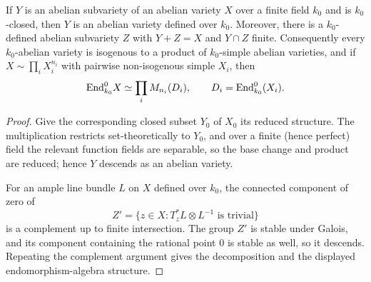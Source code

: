 \begin{proposition}
\label{mumford-prop-closed-subvariety-descent-finite-field}
If $Y$ is an abelian subvariety of an abelian variety $X$ over a finite field
$k_0$ and is $k_0$-closed, then $Y$ is an abelian variety defined over $k_0$.
Moreover, there is a $k_0$-defined abelian subvariety $Z$ with $Y+Z=X$ and
$Y\cap Z$ finite. Consequently every $k_0$-abelian variety is isogenous to a
product of $k_0$-simple abelian varieties, and if
$X\sim\prod_iX_i^{n_i}$ with pairwise non-isogenous simple $X_i$, then
\[
 {\rm End}_{k_0}^{0}X\simeq\prod_iM_{n_i}(D_i),
 \qquad D_i={\rm End}_{k_0}^{0}(X_i).
\]
\end{proposition}
\begin{proof}
Give the corresponding closed subset $Y_0$ of $X_0$ its reduced structure.
The multiplication restricts set-theoretically to $Y_0$, and over a finite
(hence perfect) field the relevant function fields are separable, so the base
change and product are reduced; hence $Y$ descends as an abelian variety.

For an ample line bundle $L$ on $X$ defined over $k_0$, the connected component
of zero of
\[
 Z'=\{z\in X:T_z^*L\otimes L^{-1}\text{ is trivial}\}
\]
is a complement up to finite intersection. The group $Z'$ is stable under
Galois, and its component containing the rational point $0$ is stable as well,
 so it descends. Repeating the complement argument gives the decomposition and
 the displayed endomorphism-algebra structure.

\end{proof}


